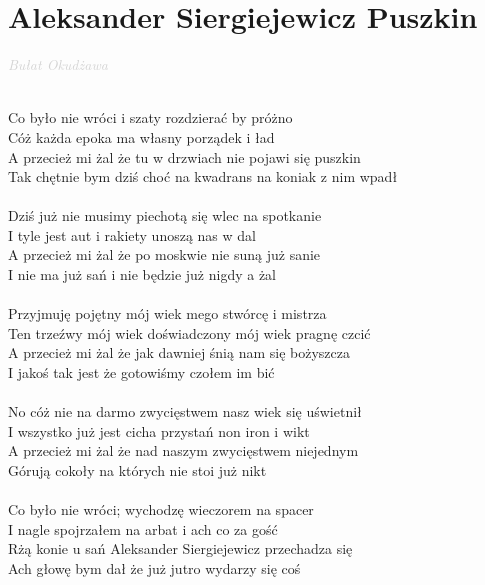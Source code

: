 \documentclass[a5paper, 10pt]{book}
\begin{document}
\newpage
\section{Aleksander Siergiejewicz Puszkin}\textcolor{lightgray}{\textit{Bułat Okudżawa}}\\~\\
\begin{minipage}[t]{0.8\textwidth}
Co było nie wróci i szaty rozdzierać by próżno\\
Cóż każda epoka ma własny porządek i ład\\
A przecież mi żal że tu w drzwiach nie pojawi się puszkin\\
Tak chętnie bym dziś choć na kwadrans na koniak z nim wpadł\\
\\
Dziś już nie musimy piechotą się wlec na spotkanie\\
I tyle jest aut i rakiety unoszą nas w dal\\
A przecież mi żal że po moskwie nie suną już sanie\\
I nie ma już sań i nie będzie już nigdy a żal\\
\\
Przyjmuję pojętny mój wiek mego stwórcę i mistrza\\
Ten trzeźwy mój wiek doświadczony mój wiek pragnę czcić\\
A przecież mi żal że jak dawniej śnią nam się bożyszcza\\
I jakoś tak jest że gotowiśmy czołem im bić\\
\\
No cóż nie na darmo zwycięstwem nasz wiek się uświetnił\\
I wszystko już jest cicha przystań non iron i wikt\\
A przecież mi żal że nad naszym zwycięstwem niejednym\\
Górują cokoły na których nie stoi już nikt\\
\\
Co było nie wróci; wychodzę wieczorem na spacer\\
I nagle spojrzałem na arbat i ach co za gość\\
Rżą konie u sań Aleksander Siergiejewicz przechadza się\\
Ach głowę bym dał że już jutro wydarzy się coś\\
\end{minipage}
\end{document}
